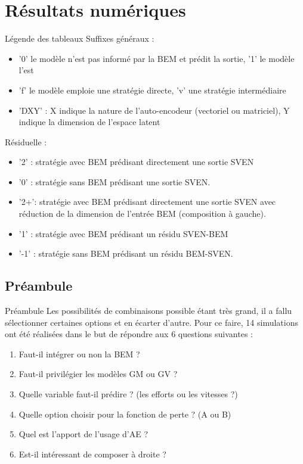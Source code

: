 \documentclass[
11pt,notheorems,hyperref={pdfauthor=whatever}
]{beamer}
\begin{document}
\section{Résultats numériques}

\begin{frame}{Légende des tableaux}
    Suffixes généraux :
    \begin{itemize}
        \item '0' le modèle n'est pas informé par la BEM et prédit la sortie, '1' le modèle l'est
        \item 'f' le modèle emploie une stratégie directe, 'v' une stratégie intermédiaire
        \item 'DXY' : X indique la nature de l'auto-encodeur (vectoriel ou matriciel), Y indique la dimension de l'espace latent
    \end{itemize}
    Résiduelle :
    \begin{itemize}
        \item '2' : stratégie avec BEM prédisant directement une sortie SVEN
        \item '0' : stratégie sans BEM prédisant une sortie SVEN.
        \item '2+': stratégie avec BEM prédisant directement une sortie SVEN avec réduction de la dimension de l'entrée BEM (composition à gauche).
        \item '1' : stratégie avec BEM prédisant un résidu SVEN-BEM
        \item '-1' : stratégie sans BEM prédisant un résidu BEM-SVEN.
     \end{itemize}
\end{frame}

\subsection{Préambule}

\begin{frame}{Préambule}        
    Les possibilités de combinaisons possible étant très grand, il a fallu sélectionner certaines options et en écarter d'autre. Pour ce faire, 14 simulations ont été réalisées dans le but de répondre aux 6 questions suivantes :
    \begin{enumerate}
        \item Faut-il intégrer ou non la BEM ?
        \item Faut-il privilégier les modèles GM ou GV ?
        \item Quelle variable faut-il prédire ? (les efforts ou les vitesses ?)
        \item Quelle option choisir pour la fonction de perte ? (A ou B)
        \item Quel est l'apport de l'usage d'AE ?
        \item Est-il intéressant de composer à droite ?
    \end{enumerate} 
\end{frame}
\end{document}
